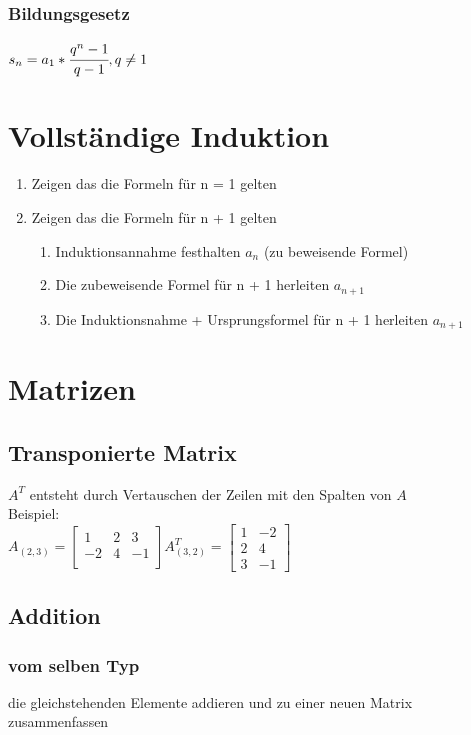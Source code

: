 \documentclass[a4paper,12pt]{scrartcl}
\begin{document}
\subsubsection{Bildungsgesetz}
$s_n = a_1 * \cfrac{q^n - 1}{q - 1}, q \ne 1$

\section{Vollständige Induktion}
\begin{enumerate}
\item Zeigen das die Formeln für n = 1 gelten
\item Zeigen das die Formeln für n + 1 gelten
\begin{enumerate}
\item Induktionsannahme festhalten $a_n$ (zu beweisende Formel)
\item Die zubeweisende Formel für n + 1 herleiten $a_{n+1}$
\item Die Induktionsnahme + Ursprungsformel für n + 1 herleiten $a_{n+1}$
\end{enumerate}
\end{enumerate}

\section{Matrizen}
\subsection{Transponierte Matrix}
$A^T$ entsteht durch Vertauschen der Zeilen mit den Spalten von $A$\\

Beispiel: \\
$A_{(2,3)} = 
\begin{bmatrix}
 1 & 2 & 3\\
 -2 & 4 & -1 \\
\end{bmatrix}
A_{(3,2)}^T = 
\begin{bmatrix}
 1 & -2\\
 2 & 4\\
 3 & -1
\end{bmatrix}
$
\subsection{Addition}
\subsubsection{vom selben Typ}
die gleichstehenden Elemente addieren und zu einer neuen Matrix zusammenfassen
\end{document}
